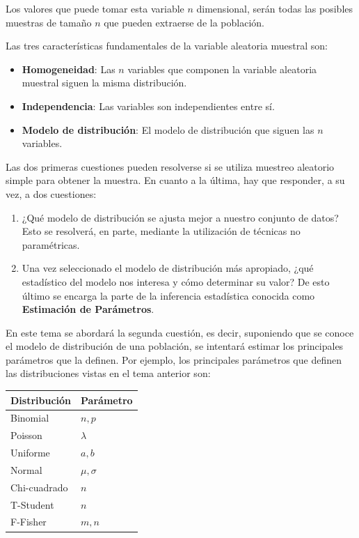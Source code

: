 \documentclass[
  a4paper,
]{scrreport}
\providecommand{\tightlist}{%
  \setlength{\itemsep}{0pt}\setlength{\parskip}{0pt}}\usepackage{longtable,booktabs,array}
\theoremstyle{definition}
\theoremstyle{definition}
\theoremstyle{plain}
\theoremstyle{remark}
\begin{document}
Los valores que puede tomar esta variable \(n\) dimensional, serán todas
las posibles muestras de tamaño \(n\) que pueden extraerse de la
población.

Las tres características fundamentales de la variable aleatoria muestral
son:

\begin{itemize}
\item
  \textbf{Homogeneidad}: Las \(n\) variables que componen la variable
  aleatoria muestral siguen la misma distribución.
\item
  \textbf{Independencia}: Las variables son independientes entre sí.
\item
  \textbf{Modelo de distribución}: El modelo de distribución que siguen
  las \(n\) variables.
\end{itemize}

Las dos primeras cuestiones pueden resolverse si se utiliza muestreo
aleatorio simple para obtener la muestra. En cuanto a la última, hay que
responder, a su vez, a dos cuestiones:

\begin{enumerate}
\def\labelenumi{\arabic{enumi}.}
\tightlist
\item
  ¿Qué modelo de distribución se ajusta mejor a nuestro conjunto de
  datos? Esto se resolverá, en parte, mediante la utilización de
  técnicas no paramétricas.
\item
  Una vez seleccionado el modelo de distribución más apropiado, ¿qué
  estadístico del modelo nos interesa y cómo determinar su valor? De
  esto último se encarga la parte de la inferencia estadística conocida
  como \textbf{Estimación de Parámetros}.
\end{enumerate}

En este tema se abordará la segunda cuestión, es decir, suponiendo que
se conoce el modelo de distribución de una población, se intentará
estimar los principales parámetros que la definen. Por ejemplo, los
principales parámetros que definen las distribuciones vistas en el tema
anterior son:

\begin{longtable}[]{@{}ll@{}}
\toprule\noalign{}
Distribución & Parámetro \\
\midrule\noalign{}
\endhead
\bottomrule\noalign{}
\endlastfoot
Binomial & \(n,p\) \\
Poisson & \(\lambda\) \\
Uniforme & \(a,b\) \\
Normal & \(\mu,\sigma\) \\
Chi-cuadrado & \(n\) \\
T-Student & \(n\) \\
F-Fisher & \(m,n\) \\
\end{longtable}
\end{document}

